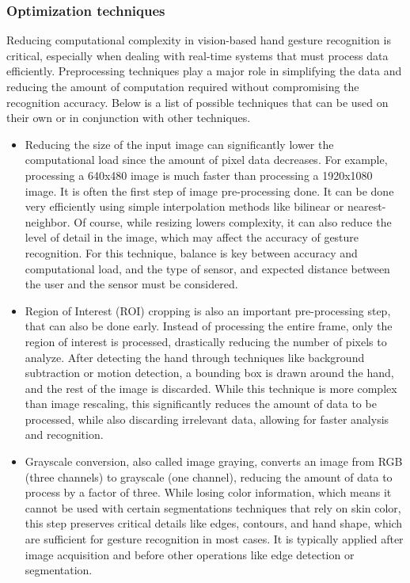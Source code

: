 \documentclass[12pt]{article}
\begin{document}
\subsubsection{Optimization techniques}
Reducing computational complexity in vision-based hand gesture recognition is critical, especially when dealing with real-time systems that must process data efficiently. Preprocessing techniques play a major role in simplifying the data and reducing the amount of computation required without compromising the recognition accuracy. Below is a list of possible techniques that can be used on their own or in conjunction with other techniques.
\begin{itemize}
  \item Reducing the size of the input image can significantly lower the computational load since the amount of pixel data decreases. For example, processing a 640x480 image is much faster than processing a 1920x1080 image. It is often the first step of image pre-processing done. It can be done very efficiently using simple interpolation methods like bilinear or nearest-neighbor. Of course, while resizing lowers complexity, it can also reduce the level of detail in the image, which may affect the accuracy of gesture recognition. For this technique, balance is key between accuracy and computational load, and the type of sensor, and expected distance between the user and the sensor must be considered.
  \item Region of Interest (ROI) cropping is also an important pre-processing step, that can also be done early. Instead of processing the entire frame, only the region of interest is processed, drastically reducing the number of pixels to analyze. After detecting the hand through techniques like background subtraction or motion detection, a bounding box is drawn around the hand, and the rest of the image is discarded. While this technique is more complex than image rescaling, this significantly reduces the amount of data to be processed, while also discarding irrelevant data, allowing for faster analysis and recognition. 
  \item Grayscale conversion, also called image graying, converts an image from RGB (three channels) to grayscale (one channel), reducing the amount of data to process by a factor of three. While losing color information, which means it cannot be used with certain segmentations techniques that rely on skin color, this step preserves critical details like edges, contours, and hand shape, which are sufficient for gesture recognition in most cases. It is typically applied after image acquisition and before other operations like edge detection or segmentation.

\end{itemize}
\end{document}

